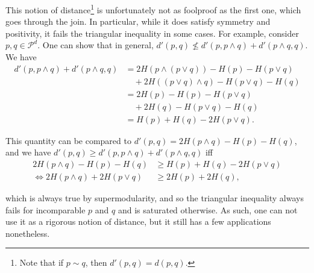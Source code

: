 This notion of distance\footnote{Note that if $p \sim q$, then $d'(p, q) = d(p, q)$.} is unfortunately not as foolproof as the first one, which goes through the join. In particular, while it does satisfy symmetry and positivity, it fails the triangular inequality in some cases. For example, consider $p, q \in \mathcal{P}^d$. One can show that in general, $d'(p, q) \nleq d'(p, p \wedge q) + d'(p \wedge q, q)$. We have
\begin{align}
    d'(p, p \wedge q) + d'(p \wedge q, q) &= 2 H(p \wedge (p \vee q)) - H(p) - H(p \vee q)\nonumber \\
                                          &\quad + 2 H((p \vee q) \wedge q) - H(p \vee q) - H(q)\\
                                          &= 2 H(p) - H(p) - H(p \vee q)\nonumber\\
                                          &\quad + 2 H(q) - H(p \vee q) - H(q)\\
                                          &= H(p) + H(q) - 2 H(p \vee q).
\end{align}

This quantity can be compared to $d'(p, q) = 2 H(p \wedge q) - H(p) - H(q)$, and we have $d'(p, q) \geq d'(p, p \wedge q) + d'(p \wedge q, q)$ iff
\begin{align}
    2 H(p \wedge q) - H(p) - H(q) &\geq H(p) + H(q) - 2 H(p \vee q)\\
    \iff 2 H(p \wedge q) + 2 H(p \vee q) &\geq 2 H(p) + 2 H(q),
\end{align}

which is always true by supermodularity, and so the triangular inequality always fails for incomparable $p$ and $q$ and is saturated otherwise. As such, one can not use it as a rigorous notion of distance, but it still has a few applications nonetheless.


